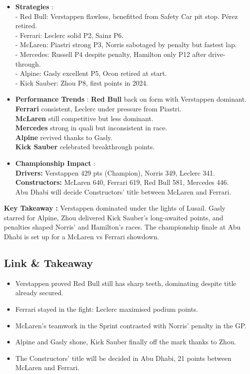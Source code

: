 \begin{itemize}
    \item \textbf{Strategies} : \\
    - Red Bull: Verstappen flawless, benefitted from Safety Car pit stop. Pérez retired. \\
    - Ferrari: Leclerc solid P2, Sainz P6. \\
    - McLaren: Piastri strong P3, Norris sabotaged by penalty but fastest lap. \\
    - Mercedes: Russell P4 despite penalty, Hamilton only P12 after drive-through. \\
    - Alpine: Gasly excellent P5, Ocon retired at start. \\
    - Kick Sauber: Zhou P8, first points in 2024. 

    \item \textbf{Performance Trends} : \textbf{Red Bull} back on form with Verstappen dominant.\\
    \textbf{Ferrari} consistent, Leclerc under pressure from Piastri. \\
    \textbf{McLaren} still competitive but less dominant. \\
    \textbf{Mercedes} strong in quali but inconsistent in race.\\
    \textbf{Alpine} revived thanks to Gasly. \\
    \textbf{Kick Sauber} celebrated breakthrough points.

    \item \textbf{Championship Impact} : \\
    \textbf{Drivers:} Verstappen 429 pts (Champion), Norris 349, Leclerc 341. \\
    \textbf{Constructors:} McLaren 640, Ferrari 619, Red Bull 581, Mercedes 446. \\
    Abu Dhabi will decide Constructors’ title between McLaren and Ferrari.
\end{itemize}

\textbf{Key Takeaway :} Verstappen dominated under the lights of Lusail. Gasly starred for Alpine, Zhou delivered Kick Sauber’s long-awaited points, and penalties shaped Norris’ and Hamilton’s races. The championship finale at Abu Dhabi is set up for a McLaren vs Ferrari showdown.

\subsection{Link \& Takeaway}

\begin{itemize}
    \item Verstappen proved Red Bull still has sharp teeth, dominating despite title already secured. 
    \item Ferrari stayed in the fight: Leclerc maximised podium points. 
    \item McLaren’s teamwork in the Sprint contrasted with Norris’ penalty in the GP. 
    \item Alpine and Gasly shone, Kick Sauber finally off the mark thanks to Zhou. 
    \item The Constructors’ title will be decided in Abu Dhabi, 21 points between McLaren and Ferrari. 
\end{itemize}
